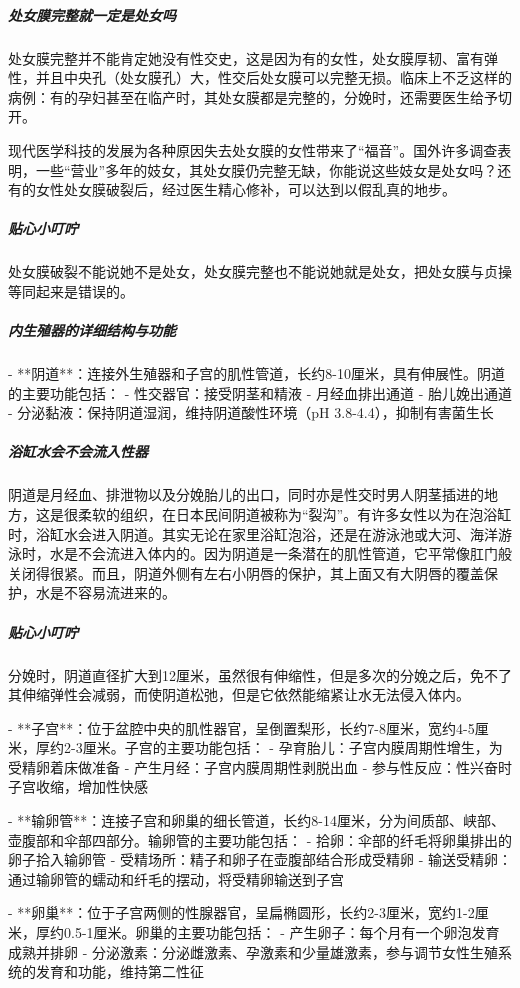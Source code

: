 \begin{enumerate}
\subparagraph{处女膜完整就一定是处女吗}

处女膜完整并不能肯定她没有性交史，这是因为有的女性，处女膜厚韧、富有弹性，并且中央孔（处女膜孔）大，性交后处女膜可以完整无损。临床上不乏这样的病例：有的孕妇甚至在临产时，其处女膜都是完整的，分娩时，还需要医生给予切开。

现代医学科技的发展为各种原因失去处女膜的女性带来了“福音”。国外许多调查表明，一些“营业”多年的妓女，其处女膜仍完整无缺，你能说这些妓女是处女吗？还有的女性处女膜破裂后，经过医生精心修补，可以达到以假乱真的地步。

\subparagraph{贴心小叮咛}

处女膜破裂不能说她不是处女，处女膜完整也不能说她就是处女，把处女膜与贞操等同起来是错误的。

\subparagraph{内生殖器的详细结构与功能}

- **阴道**：连接外生殖器和子宫的肌性管道，长约8-10厘米，具有伸展性。阴道的主要功能包括：
  - 性交器官：接受阴茎和精液
  - 月经血排出通道
  - 胎儿娩出通道
  - 分泌黏液：保持阴道湿润，维持阴道酸性环境（pH 3.8-4.4），抑制有害菌生长

\subparagraph{浴缸水会不会流入性器}

阴道是月经血、排泄物以及分娩胎儿的出口，同时亦是性交时男人阴茎插进的地方，这是很柔软的组织，在日本民间阴道被称为“裂沟”。有许多女性以为在泡浴缸时，浴缸水会进入阴道。其实无论在家里浴缸泡浴，还是在游泳池或大河、海洋游泳时，水是不会流进入体内的。因为阴道是一条潜在的肌性管道，它平常像肛门般关闭得很紧。而且，阴道外侧有左右小阴唇的保护，其上面又有大阴唇的覆盖保护，水是不容易流进来的。

\subparagraph{贴心小叮咛}

分娩时，阴道直径扩大到12厘米，虽然很有伸缩性，但是多次的分娩之后，免不了其伸缩弹性会减弱，而使阴道松弛，但是它依然能缩紧让水无法侵入体内。

- **子宫**：位于盆腔中央的肌性器官，呈倒置梨形，长约7-8厘米，宽约4-5厘米，厚约2-3厘米。子宫的主要功能包括：
  - 孕育胎儿：子宫内膜周期性增生，为受精卵着床做准备
  - 产生月经：子宫内膜周期性剥脱出血
  - 参与性反应：性兴奋时子宫收缩，增加性快感

- **输卵管**：连接子宫和卵巢的细长管道，长约8-14厘米，分为间质部、峡部、壶腹部和伞部四部分。输卵管的主要功能包括：
  - 拾卵：伞部的纤毛将卵巢排出的卵子拾入输卵管
  - 受精场所：精子和卵子在壶腹部结合形成受精卵
  - 输送受精卵：通过输卵管的蠕动和纤毛的摆动，将受精卵输送到子宫

- **卵巢**：位于子宫两侧的性腺器官，呈扁椭圆形，长约2-3厘米，宽约1-2厘米，厚约0.5-1厘米。卵巢的主要功能包括：
  - 产生卵子：每个月有一个卵泡发育成熟并排卵
  - 分泌激素：分泌雌激素、孕激素和少量雄激素，参与调节女性生殖系统的发育和功能，维持第二性征


\end{enumerate}
